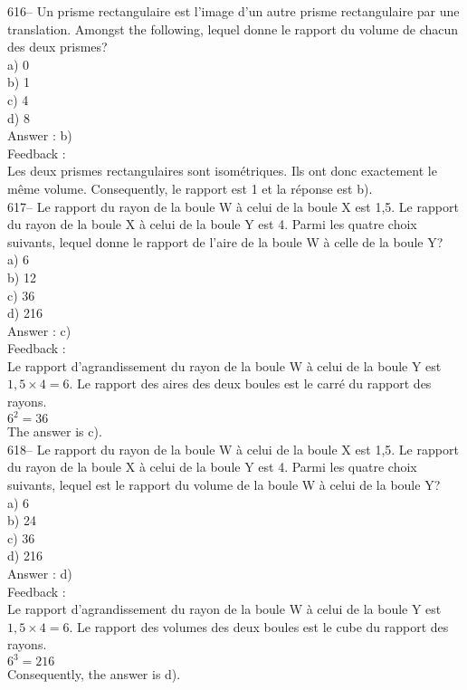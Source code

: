 ﻿\documentclass[letterpaper, 12pt]{article}
\begin{document}
616-- Un prisme rectangulaire est l'image d'un autre prisme rectangulaire
par une translation.  Amongst the following, lequel donne le
rapport du volume de chacun des deux prismes?\\
a) 0\\
b) 1\\
c) 4\\
d) 8\\

Answer : b)\\

Feedback : \\
Les deux prismes rectangulaires sont isom\'etriques.  Ils ont donc
exactement le m\^eme volume.  Consequently, le rapport est 1 et la
r\'eponse est b).\\

617-- Le rapport du rayon de la boule W \`a celui de la boule X est 1,5.  Le
rapport du rayon de la boule X \`a celui de la boule Y est 4.  Parmi les
quatre choix suivants, lequel donne le rapport de l'aire de la boule W \`a
celle de la boule Y?\\
a) 6\\
b) 12\\
c) 36\\
d) 216\\

Answer : c)\\

Feedback : \\
Le rapport d'agrandissement du rayon de la boule W \`a celui de la boule Y
est $1,5\times4=6$.  Le rapport des aires des deux boules est le carr\'e du
rapport des rayons.\\
$6^{2}=36$\\
The answer is c).\\

618-- Le rapport du rayon de la boule W \`a celui de la boule X est 1,5.  Le
rapport du rayon de la boule X \`a celui de la boule Y est 4.  Parmi les
quatre choix suivants, lequel est le rapport du volume de la boule W \`a
celui de la boule Y?\\
a) 6\\
b) 24\\
c) 36\\
d) 216\\

Answer : d)\\

Feedback : \\
Le rapport d'agrandissement du rayon de la boule W \`a celui de la boule Y
est $1,5\times4=6$.  Le rapport des volumes des deux boules est le cube du
rapport des rayons.\\
$6^{3}=216$  \\
Consequently, the answer is d).\\
\end{document}
